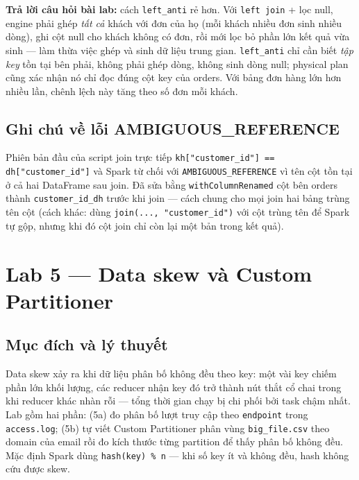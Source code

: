 \documentclass[12pt,a4paper,oneside]{article}
\begin{document}
\textbf{Trả lời câu hỏi bài lab:} cách \texttt{left\_anti} rẻ hơn. Với \texttt{left join} + lọc null, engine phải ghép \emph{tất cả} khách với đơn của họ (mỗi khách nhiều đơn sinh nhiều dòng), ghi cột null cho khách không có đơn, rồi mới lọc bỏ phần lớn kết quả vừa sinh --- làm thừa việc ghép và sinh dữ liệu trung gian. \texttt{left\_anti} chỉ cần biết \emph{tập key} tồn tại bên phải, không phải ghép dòng, không sinh dòng null; physical plan cũng xác nhận nó chỉ đọc đúng cột key của orders. Với bảng đơn hàng lớn hơn nhiều lần, chênh lệch này tăng theo số đơn mỗi khách.

\subsection{Ghi chú về lỗi AMBIGUOUS\_REFERENCE}

Phiên bản đầu của script join trực tiếp \texttt{kh["customer\_id"] == dh["customer\_id"]} và Spark từ chối với \texttt{AMBIGUOUS\_REFERENCE} vì tên cột tồn tại ở cả hai DataFrame sau join. Đã sửa bằng \texttt{withColumnRenamed} cột bên orders thành \texttt{customer\_id\_dh} trước khi join --- cách chung cho mọi join hai bảng trùng tên cột (cách khác: dùng \texttt{join(..., "customer\_id")} với cột trùng tên để Spark tự gộp, nhưng khi đó cột join chỉ còn lại một bản trong kết quả).

\section{Lab 5 --- Data skew và Custom Partitioner}
\label{sec:lab5}

\subsection{Mục đích và lý thuyết}

Data skew xảy ra khi dữ liệu phân bố không đều theo key: một vài key chiếm phần lớn khối lượng, các reducer nhận key đó trở thành nút thắt cổ chai trong khi reducer khác nhàn rỗi --- tổng thời gian chạy bị chi phối bởi task chậm nhất. Lab gồm hai phần: (5a) đo phân bố lượt truy cập theo \texttt{endpoint} trong \texttt{access.log}; (5b) tự viết Custom Partitioner phân vùng \texttt{big\_file.csv} theo domain của email rồi đo kích thước từng partition để thấy phân bố không đều. Mặc định Spark dùng \texttt{hash(key) \% n} --- khi số key ít và không đều, hash không cứu được skew.
\end{document}
